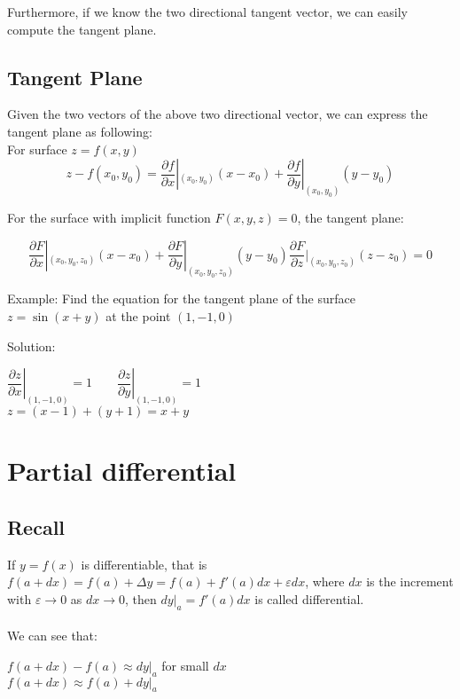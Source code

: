 \documentclass[UTF8,a4paper, 10pt, openany]{svmono}
\begin{document}
Furthermore, if we know the two directional tangent vector, we can easily compute the tangent plane.
\subsection{Tangent Plane}
Given the two vectors of the above two directional vector, we can express the tangent plane as following: \\

For surface $z=f(x,y)$
\begin{equation}
\boxed{z-f(x_0,y_0)=\dfrac{\partial f}{\partial x}|_{(x_0,y_0)}(x-x_0)+\dfrac{\partial f}{\partial y}|_{(x_0,y_0)}(y-y_0)}
\end{equation}

For the surface with implicit function $F(x,y,z)=0$, the tangent plane:

\begin{equation}
\boxed{\dfrac{\partial F}{\partial x}|_{(x_0,y_0,z_0)}(x-x_0)+\dfrac{\partial F}{\partial y}|_{(x_0,y_0,z_0)}(y-y_0)\dfrac{\partial F}{\partial z}|_{(x_0,y_0,z_0)}(z-z_0)=0}
\end{equation}

Example: Find the equation for the tangent plane of the surface $z=\sin (x+y)$ at the point $(1,-1,0)$

Solution:
\begin{center}
$\left. \dfrac{\partial z}{\partial x} \right|_{(1,-1,0)}=1 \qquad \left. \dfrac{\partial z}{\partial y} \right|_{(1,-1,0)}=1$\\
$z=(x-1)+(y+1)=x+y$
\end{center}

\section{Partial differential}
\subsection{Recall}
If $y=f(x)$ is differentiable, that is $f(a+dx)=f(a)+\Delta y=f(a)+f'(a)dx+\varepsilon dx$, where $dx$ is the increment with $\varepsilon \to 0$ as $dx \to 0$, then $dy|_{a}=f'(a)dx$ is called differential.\\ \\

We can see that:

\begin{center}
$f(a+dx)-f(a)\approx dy|_{a}$ for small $dx$\\
$f(a+dx)\approx f(a)+dy|_{a}$
\end{center}
\end{document}
